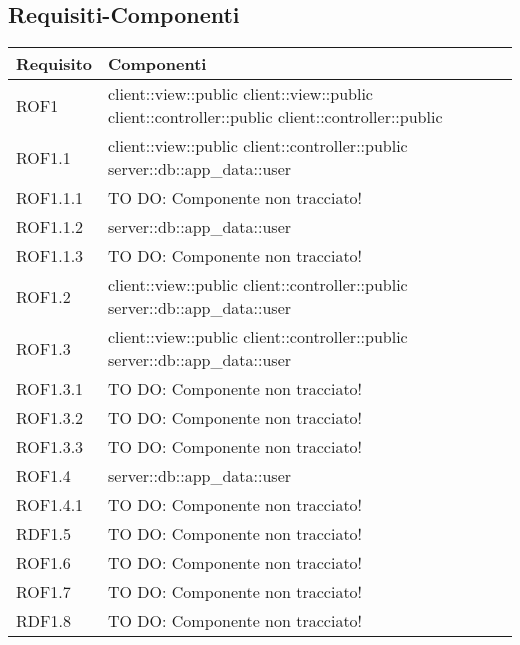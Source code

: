 \subsection{Requisiti-Componenti} %
\label{sub:componenti_requisiti}
\begin{center}
\def\arraystretch{1.5}
\bgroup
\begin{longtable}{| p{4cm} | p{8cm} |}
\hline
\textbf{Requisito} & \textbf{Componenti} \\
\hline
ROF1 & client::view::public \newline client::view::public \newline client::controller::public \newline client::controller::public \\
\hline
ROF1.1 & client::view::public \newline client::controller::public \newline server::db::app\_data::user \\
\hline
ROF1.1.1 & TO DO: Componente non tracciato! \\
\hline
ROF1.1.2 & server::db::app\_data::user \\
\hline
ROF1.1.3 & TO DO: Componente non tracciato! \\
\hline
ROF1.2 & client::view::public \newline client::controller::public \newline server::db::app\_data::user \\
\hline
ROF1.3 & client::view::public \newline client::controller::public \newline server::db::app\_data::user \\
\hline
ROF1.3.1 & TO DO: Componente non tracciato! \\
\hline
ROF1.3.2 & TO DO: Componente non tracciato! \\
\hline
ROF1.3.3 & TO DO: Componente non tracciato! \\
\hline
ROF1.4 & server::db::app\_data::user \\
\hline
ROF1.4.1 & TO DO: Componente non tracciato! \\
\hline
RDF1.5 & TO DO: Componente non tracciato! \\
\hline
ROF1.6 & TO DO: Componente non tracciato! \\
\hline
ROF1.7 & TO DO: Componente non tracciato! \\
\hline
RDF1.8 & TO DO: Componente non tracciato! \\
\hline

\end{longtable}
\end{center}
